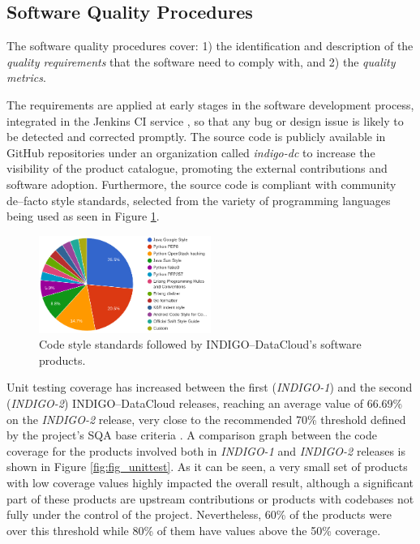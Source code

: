 \documentclass[journal]{IEEEtran}
\begin{document}
\subsection{Software Quality Procedures}

The software quality procedures \cite{indigo-d31} cover: 1) the identification
and description of the \emph{quality requirements} that the software need to
comply with, and 2) the \emph{quality metrics}.

The requirements are applied at early stages in the software development
process, integrated in the Jenkins CI service \cite{indigo-jenkins}, so that any
bug or design issue is likely to be detected and corrected promptly. The source
code is publicly available in GitHub repositories under an organization called
{\sl indigo-dc} \cite{indigo-github} to increase the visibility of the product
catalogue, promoting the external contributions and software adoption. Furthermore,
the source code is compliant with community de--facto style standards,
selected from the variety of programming languages being used as seen in
Figure \ref{fig:fig_codestyle}.

\begin{figure}[ht]
\centering
\includegraphics[width=0.5\textwidth]{images/codestyle.png}
\caption{Code style standards followed by INDIGO--DataCloud's software products.}
\label{fig:fig_codestyle}
\end{figure}

Unit testing coverage has increased between the first ({\sl INDIGO-1}) and the
second ({\sl INDIGO-2}) INDIGO--DataCloud releases, reaching an average value of
66.69\% on the {\sl INDIGO-2} release, very close to the recommended 70\% threshold
defined by the project’s SQA base criteria \cite{indigo-d31}. A comparison graph
between the code coverage for the products involved both in {\sl INDIGO-1} and
{\sl INDIGO-2} releases is shown in Figure \ref{fig:fig_unittest}. As it can be seen,
a very small set of products with low coverage values highly impacted the overall
result, although a significant part of these products are upstream contributions
or products with codebases not fully under the control of the project. Nevertheless,
60\% of the products were over this threshold while 80\% of them have values above
the 50\% coverage.
\end{document}
